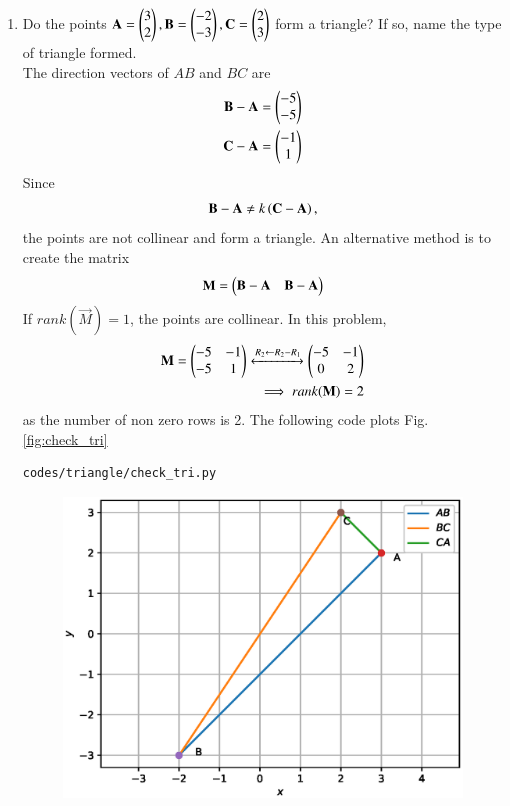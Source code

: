 \renewcommand{\theequation}{\theenumi}
\begin{enumerate}[label=\arabic*.,ref=\thesubsection.\theenumi]
%
\item Do the points $\mathbf{A}=\begin{pmatrix}3\\2\end{pmatrix}, \mathbf{B}=\begin{pmatrix}-2\\-3\end{pmatrix}, \mathbf{C}=\begin{pmatrix}2\\3\end{pmatrix} $ form a triangle?  If so, name the type of triangle formed.
\label{prob:tri_exam_coll_pts}
%
\\
\solution The direction vectors of $AB$ and $BC$ are 
\begin{align}
\label{eq:tri_geo_ex_baorth}
\mathbf{B}-\mathbf{A} &= \begin{pmatrix}-5\\-5\end{pmatrix}
\\
\mathbf{C}-\mathbf{A} &= \begin{pmatrix}-1\\1\end{pmatrix}
\label{eq:tri_geo_ex_caorth}
\end{align}
%
Since 
%
\begin{align}
\mathbf{B}-\mathbf{A} \ne k\left(\mathbf{C}-\mathbf{A}\right),
\end{align}
%
the points are not collinear and form a triangle.  An alternative method is to create the matrix
\begin{align}
\label{eq:tri_geo_ex_diff_mat}
\mathbf{M} = \begin{pmatrix}\mathbf{B}-\mathbf{A} & \mathbf{B}-\mathbf{A}\end{pmatrix} 
\end{align}
%
If $rank(\vec{M}) = 1$, the points are collinear.  In this problem, 
%
\begin{align}
\mathbf{M} = \begin{pmatrix}-5 & -1\\-5 & 1\end{pmatrix}\xleftrightarrow {R_2\leftarrow R_2-R_1}\begin{pmatrix}-5 & -1\\0 & 2\end{pmatrix}
\\
\implies rank(\mathbf{M}) = 2
\end{align}
%
as the number of non zero rows is 2.
The following code plots Fig. \ref{fig:check_tri}
%
\begin{lstlisting}
codes/triangle/check_tri.py
\end{lstlisting}
%
\begin{figure}[!ht]
\includegraphics[width=\columnwidth]{./triangle/figs/check_tri.eps}

\end{figure}
\end{enumerate}
